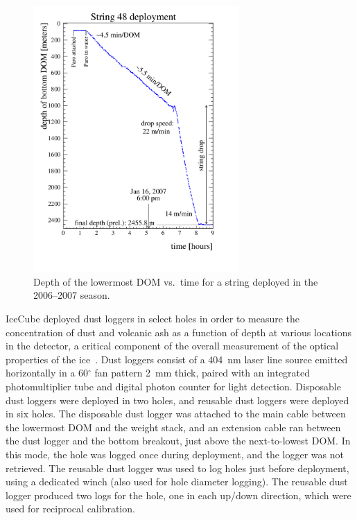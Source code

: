 \begin{figure}[!ht]
 \centering
 \includegraphics[width=0.70\textwidth]{graphics/drill/String48_deploy.pdf}
\caption{Depth of the lowermost DOM vs.~time for a string deployed in the
  2006--2007 season.}
\label{fig:deploytime}
\end{figure}

IceCube deployed dust loggers in select holes in order to measure the
concentration of dust and volcanic ash as a function of depth at various
locations in the detector, a critical component of the overall measurement
of the optical properties of the ice~\cite{Aartsen:2013rt,citeulike:2998650}. Dust loggers 
consist of a 404~nm laser line source emitted horizontally in a
60$^{\circ}$ fan pattern 2~mm thick, paired with an integrated
photomultiplier tube and digital photon counter for light
detection. Disposable dust loggers were deployed in two holes, and reusable dust loggers were
deployed in six holes. The disposable dust
logger was attached to the main cable between the lowermost DOM and the
weight stack, and an extension cable ran between the dust logger and the
bottom breakout, just above the next-to-lowest DOM. In this mode, the hole
was logged once during deployment, and the logger was not
retrieved. The reusable dust logger was used to
log holes just before deployment, using a dedicated winch (also used for
hole diameter logging). The reusable dust logger produced two logs for the
hole, one in each up/down direction, which were used for
reciprocal calibration.


